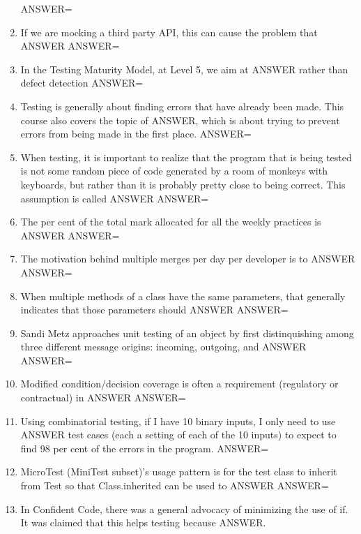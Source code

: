 \documentclass{exam}
\begin{document}
\begin{enumerate}
ANSWER=
\item If we are mocking a third party API, this can cause the problem that ANSWER\newline
ANSWER=
\item In the Testing Maturity Model, at Level 5, we aim at ANSWER rather than defect detection\newline
ANSWER=
\item Testing is generally about finding errors that have already been made.  This course also covers the topic of ANSWER, which is about trying to prevent errors from being made in the first place.\newline
ANSWER=
\item When testing, it is important to realize that the program that is being tested is not some random piece of code generated by a room of monkeys with keyboards, but rather than it is probably pretty close to being correct.  This assumption is called ANSWER\newline
ANSWER=
\item The per cent of the total mark allocated for all the weekly practices is ANSWER\newline
ANSWER=
\item The motivation behind multiple merges per day per developer is to ANSWER\newline
ANSWER=
\item When multiple methods of a class have the same parameters, that generally indicates that those parameters should ANSWER\newline
ANSWER=
\item Sandi Metz approaches unit testing of an object by first distinquishing among three different message origins: incoming, outgoing, and ANSWER\newline
ANSWER=
\item Modified condition/decision coverage is often a requirement (regulatory or contractual) in ANSWER\newline
ANSWER=
\item Using combinatorial testing, if I have 10 binary inputs, I only need to use ANSWER test cases (each a setting of each of the 10 inputs) to expect to find 98 per cent of the errors in the program.\newline
ANSWER=
\item MicroTest (MiniTest subset)'s usage pattern is for the test class to inherit from Test so that Class.inherited can be used to ANSWER\newline
ANSWER=
\item In Confident Code, there was a general advocacy of minimizing the use of if.  It was claimed that this helps testing because ANSWER.\newline

\end{enumerate}
\end{document}
